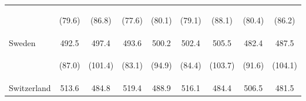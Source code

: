 \begin{center}
\begin{tabular}{lcccccccc}
 & \begin{footnotesize}(79.6)\end{footnotesize} & \begin{footnotesize}(86.8)\end{footnotesize} & \begin{footnotesize}(77.6)\end{footnotesize} & \begin{footnotesize}(80.1)\end{footnotesize} & \begin{footnotesize}(79.1)\end{footnotesize} & \begin{footnotesize}(88.1)\end{footnotesize} & \begin{footnotesize}(80.4)\end{footnotesize} & \begin{footnotesize}(86.2)\end{footnotesize}\\
\noalign{\smallskip}Sweden & 492.5 & 497.4 & 493.6 & 500.2 & 502.4 & 505.5 & 482.4 & 487.5\\
 & \begin{footnotesize}(87.0)\end{footnotesize} & \begin{footnotesize}(101.4)\end{footnotesize} & \begin{footnotesize}(83.1)\end{footnotesize} & \begin{footnotesize}(94.9)\end{footnotesize} & \begin{footnotesize}(84.4)\end{footnotesize} & \begin{footnotesize}(103.7)\end{footnotesize} & \begin{footnotesize}(91.6)\end{footnotesize} & \begin{footnotesize}(104.1)\end{footnotesize}\\
\noalign{\smallskip}Switzerland & 513.6 & 484.8 & 519.4 & 488.9 & 516.1 & 484.4 & 506.5 & 481.5\\

\end{tabular}
\end{center}
